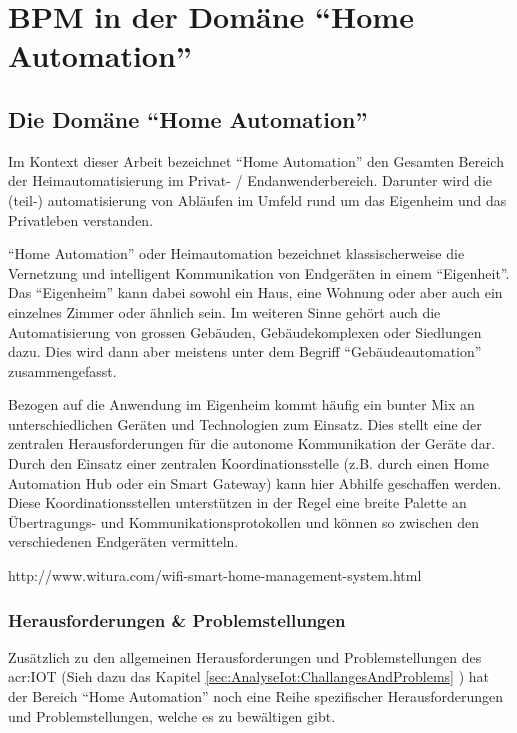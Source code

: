
\chapter{BPM in der Domäne "`Home Automation"'}

\section{Die Domäne "`Home Automation"'}
Im Kontext dieser Arbeit bezeichnet "`Home Automation"' den Gesamten Bereich der Heimautomatisierung im Privat- / Endanwenderbereich. Darunter wird die (teil-) automatisierung von Abläufen im Umfeld rund um das Eigenheim und das Privatleben verstanden.

"`Home Automation"' oder Heimautomation bezeichnet klassischerweise die Vernetzung und intelligent Kommunikation von Endgeräten in einem "`Eigenheit"'. Das "`Eigenheim"' kann dabei sowohl ein Haus, eine Wohnung oder aber auch ein einzelnes Zimmer oder ähnlich sein. Im weiteren Sinne gehört auch die Automatisierung von grossen Gebäuden, Gebäudekomplexen oder Siedlungen dazu. Dies wird dann aber meistens unter dem Begriff "`Gebäudeautomation"' zusammengefasst.

Bezogen auf die Anwendung im Eigenheim kommt häufig ein bunter Mix an unterschiedlichen Geräten und Technologien zum Einsatz. Dies stellt eine der zentralen Herausforderungen für die autonome Kommunikation der Geräte dar. Durch den Einsatz einer zentralen Koordinationsstelle (z.B. durch einen Home Automation Hub oder ein Smart Gateway) kann hier Abhilfe geschaffen werden. Diese Koordinationsstellen unterstützen in der Regel eine breite Palette an Übertragungs- und Kommunikationsprotokollen und können so zwischen den verschiedenen Endgeräten vermitteln. 

http://www.witura.com/wifi-smart-home-management-system.html

\subsection{Herausforderungen \& Problemstellungen}
Zusätzlich zu den allgemeinen Herausforderungen und Problemstellungen des \gls{acr:IOT} (Sieh dazu das Kapitel \ref{sec:AnalyseIot:ChallangesAndProblems} ) hat der Bereich "`Home Automation"' noch eine Reihe spezifischer Herausforderungen und Problemstellungen, welche es zu bewältigen gibt.

